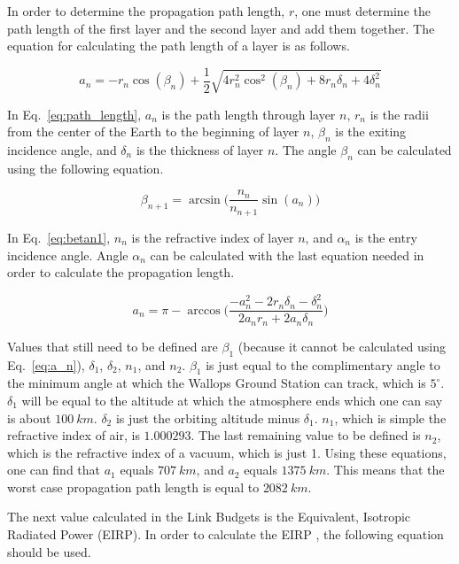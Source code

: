\documentclass[12pt]{article}
\begin{document}
In order to determine the propagation path length, $r$, one must determine the path length of the first layer and the second layer and add them together. The equation for calculating \cite{ITU-R} the path length of a layer is as follows.

\begin{equation}\label{eq:path_length}
a_n = -r_n\cos(\beta_n) + \frac{1}{2}\sqrt{4r_n^2\cos^2(\beta_n)+8r_n\delta_n+4\delta_n^2} 
\end{equation}

In Eq.~\ref{eq:path_length}, $a_n$ is the path length through layer $n$, $r_n$ is the radii from the center of the Earth to the beginning of layer $n$, $\beta_n$ is the exiting incidence angle, and $\delta_n$ is the thickness of layer $n$.
The angle $\beta_n$ can be calculated \cite{ITU-R} using the following equation.

\begin{equation}\label{eq:betan1}
\beta_{n+1} = \arcsin\biggl(\frac{n_n}{n_{n+1}}\sin(a_n)\biggr) 
\end{equation}

In Eq.~\ref{eq:betan1}, $n_n$ is the refractive index of layer $n$, and $\alpha_n$ is the entry incidence angle. Angle $\alpha_n$ can be calculated with the last equation needed in order to calculate \cite{ITU-R} the propagation length.

\begin{equation}\label{eq:a_n}
a_n = \pi - \arccos \biggl(\frac{-a_n^2 - 2r_n\delta_n - \delta_n^2}{2a_n r_n + 2a_n \delta_n}\biggr) 
\end{equation}

Values that still need to be defined are $\beta_1$ (because it cannot be calculated using Eq.~\ref{eq:a_n}), $\delta_1$, $\delta_2$, $n_1$, and $n_2$. $\beta_1$ is just equal to the complimentary angle to the minimum angle at which the Wallops Ground Station can track, which is $5^\circ$. $\delta_1$ will be equal to the altitude at which the atmosphere ends which one can say is about $100\ km$. $\delta_2$ is just the orbiting altitude minus $\delta_1$. $n_1$, which is simple the refractive index of air, is $1.000293$. The last remaining value to be defined is $n_2$, which is the refractive index of a vacuum, which is just 1. Using these equations, one can find that $a_1$ equals $707\ km$, and $a_2$ equals $1375\ km$. This means that the worst case propagation path length is equal to $2082\ km$.

The next value calculated in the Link Budgets is the Equivalent, Isotropic Radiated Power (EIRP). In order to calculate the EIRP \cite{SMAD}, the following equation should be used.
\end{document}
